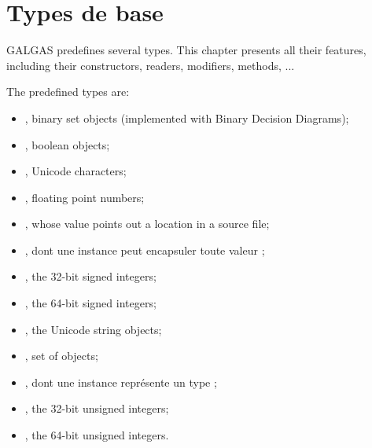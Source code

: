 
\chapter{Types de base}\label{predefinedTypes}

GALGAS predefines several types. This chapter presents all their features, including their constructors, readers, modifiers, methods, ...


\begin{description}
\item The predefined types are:
\begin{itemize}
\item {}, binary set objects (implemented with Binary Decision Diagrams);
\item {}, boolean objects;
\item {}, Unicode characters;
\item {}, floating point numbers;
\item {}, whose value points out a location in a source file;
\item {}, dont une instance peut encapsuler toute valeur ;
\item {}, the 32-bit signed integers;
\item {}, the 64-bit signed integers;
\item {}, the Unicode string objects;
\item {}, set of  objects;
\item {}, dont une instance représente un type ;
\item {}, the 32-bit unsigned integers;
\item {}, the 64-bit unsigned integers.
\end{itemize}
\end{description}

